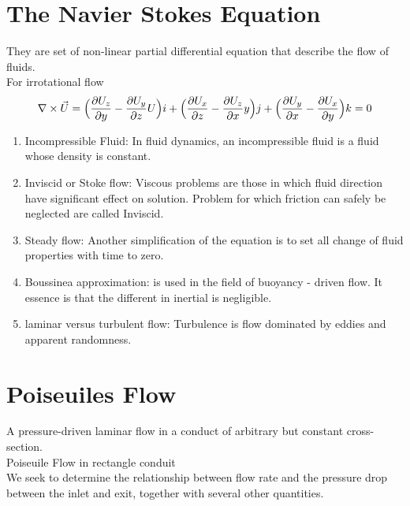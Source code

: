 \documentclass[12pt]{report}
\newcommand{\sps}{\\[0.2cm]}
\newcommand{\NI}{\noindent}
\begin{document}
	\section{The Navier Stokes Equation}
	They are set of non-linear partial differential equation that describe the flow of fluids.\sps
	For irrotational flow
	\begin{eqnarray}
		\nabla \times \vec{U} = \Big(\frac{\partial U_z}{\partial y} - \frac{\partial U_y}{\partial z}U\Big)i + \Big(\frac{\partial U_x}{\partial z} - \frac{\partial U_z}{\partial x}y\Big)j + \Big(\frac{\partial U_y}{\partial x} - \frac{\partial U_x}{\partial y}\Big)k = 0 \notag
	\end{eqnarray}
	\begin{enumerate}
		\item Incompressible Fluid: In fluid dynamics, an incompressible fluid is a fluid whose density is constant.
		
		\item Inviscid or Stoke flow: Viscous problems are those in which fluid direction have significant effect on solution. Problem for which friction can safely be neglected are called Inviscid.
		
		\item Steady flow: Another simplification of the equation is to set all change of fluid properties with time to zero.
		
		\item Boussinea approximation: is used in the field of buoyancy - driven flow. It essence is that the different in inertial is negligible.
		
		\item laminar versus turbulent flow: Turbulence is flow dominated by eddies and apparent randomness.
	\end{enumerate}

	\section{Poiseuiles Flow}
	A pressure-driven laminar flow in a conduct of arbitrary but constant cross-section.\\
	
	\NI Poiseuile Flow in rectangle conduit\\
	We seek to determine the relationship between flow rate and the pressure drop between the inlet and exit, together with several other quantities.
	
\end{document}
